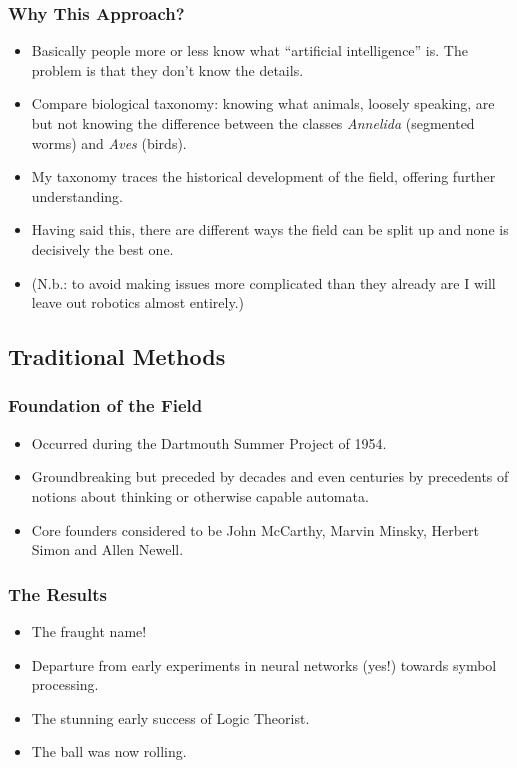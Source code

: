 \documentclass[10pt]{beamer}
\begin{document}
  \begin{frame}
    \frametitle{Why This Approach?}

    \begin{itemize}
      \item Basically people more or less know what ``artificial
        intelligence'' is. The problem is that they don't know the details.
      \pause
      \item Compare biological taxonomy: knowing what animals, loosely
        speaking, are but not knowing the difference between the classes
        \textit{Annelida} (segmented worms) and \textit{Aves} (birds).
      \pause
      \item My taxonomy traces the historical development of the field, offering
        further understanding.
      \pause
      \item Having said this, there are different ways the field can be split
        up and none is decisively the best one.
      \pause
      \item (N.b.: to avoid making issues more complicated than they already
        are I will leave out robotics almost entirely.)
    \end{itemize}
  \end{frame}

  \subsection{Traditional Methods}

  \begin{frame}
    \frametitle{Foundation of the Field}
    \begin{itemize}
      \item Occurred during the Dartmouth Summer Project of 1954.
      \pause
      \item Groundbreaking but preceded by decades and even centuries by
        precedents of notions about thinking or otherwise capable automata.
      \pause
      \item Core founders considered to be John McCarthy, Marvin Minsky,
        Herbert Simon and Allen Newell.
    \end{itemize}
  \end{frame}

  \begin{frame}
    \frametitle{The Results}
    \begin{itemize}
      \item The fraught name!
      \pause
      \item Departure from early experiments in neural networks (yes!) towards
        symbol processing.
      \pause
      \item The stunning early success of Logic Theorist.
      \pause
      \item The ball was now rolling.
    \end{itemize}
  \end{frame}
\end{document}
